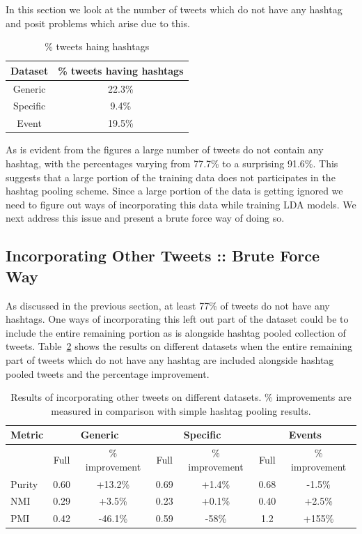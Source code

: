 \documentclass[10pt,a5paper,twoside]{article}
\begin{document}
In this section we look at the number of tweets which do not have any hashtag and posit problems which arise due to this.


\begin{table}[!h]
\centering
	\begin{tabular}{|c|c|}
	\hline
	Dataset & \% tweets having hashtags\\
	\hline
	Generic & 22.3\%\\
	\hline
	Specific & 9.4\% \\
	\hline
	Event & 19.5\% \\
	\hline
	\end{tabular}
\caption{\% tweets haing hashtags}\label{tbl-7}
\end{table}

As is evident from the figures a large number of tweets do not contain any hashtag, with the percentages varying from 77.7\% to a surprising 91.6\%. This suggests that a large portion of the training data does not participates in the hashtag pooling scheme. Since a large portion of the data is getting ignored we need to figure out ways of incorporating this data while training LDA models. We next address this issue and present a brute force way of doing so.

\subsection{Incorporating Other Tweets :: Brute Force Way}

As discussed in the previous section, at least 77\% of tweets do not have any hashtags. One ways of incorporating this left out part of the dataset could be to include the entire remaining portion as is alongside hashtag pooled collection of tweets. Table~\ref{tbl-8} shows the results on different datasets when the entire remaining part of tweets which do not have any hashtag are included alongside hashtag pooled tweets and the percentage improvement. 

\begin{table}[!h]
\centering
\resizebox{14cm}{!} 
{
	\begin{tabular}{|l|cc|cc|cc|}
	\hline
	Metric  & \multicolumn {2}{c}{Generic} & \multicolumn {2}{c}{Specific} & \multicolumn {2}{c|}{Events}\\
	\hline
	 & Full & \% improvement & Full & \% improvement & Full & \% improvement\\
	\hline
	Purity & 0.60 & +13.2\% & 0.69 & +1.4\% & 0.68 & -1.5\% \\
	\hline
	NMI & 0.29 & +3.5\% & 0.23 & +0.1\% & 0.40 & +2.5\% \\
	\hline
	PMI & 0.42 & -46.1\% & 0.59 & -58\% & 1.2 & +155\% \\
	\hline
	\end{tabular}
}
\caption{Results of incorporating other tweets on different datasets. \% improvements are measured in comparison with simple hashtag pooling results.}\label{tbl-8}
\end{table}
\end{document}
